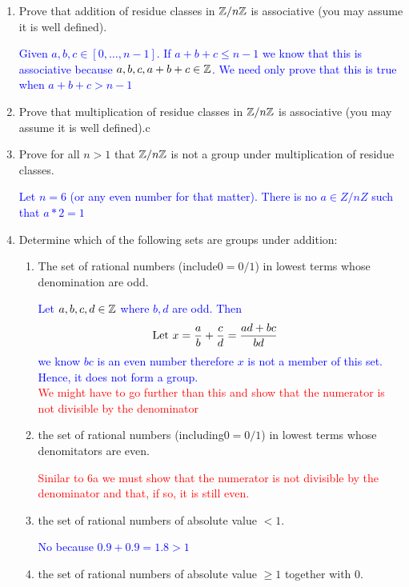 \documentclass[10pt,a4paper]{report}
\newcommand{\RED}[1]{\textcolor{red}{#1}}
\newcommand{\BLUE}[1]{\textcolor{blue}{#1}}
\begin{document}
\begin{enumerate}
\begin{enumerate}
	\end{enumerate}	
	
	\item Prove that addition of residue classes in $\mathbb{Z}/n\mathbb{Z}$ is associative (you may assume it is well defined).
	
	\BLUE{Given $a,b,c \in [0, \dots, n-1]$.  If $a+b+c \le n-1$ we know that this is associative because $a,b,c, a+b+c \in \mathbb{Z}$.  We need only prove that this is true when $a+b+c > n-1$
	}
	
	\item Prove that multiplication of residue classes in $\mathbb{Z}/n\mathbb{Z}$ is associative (you may assume it is well defined).c
	
	\item Prove for all $n >1$ that $\mathbb{Z}/n\mathbb{Z}$ is not a group under multiplication of residue classes.
	
	\BLUE{Let $n=6$ (or any even number for that matter).  There is no $a\in Z/nZ$ such that $a*2 = 1$
	}
	
	\item Determine which of the following sets are groups under addition:
	\begin{enumerate}
		\item The set of rational numbers (include$0=0/1$) in lowest terms whose denomination are odd.
		
		\BLUE{Let $a,b,c,d \in \mathbb{Z}$ where $b, d$ are odd. Then
		\begin{align*}
			\text{Let } x = \frac{a}{b} + \frac{c}{d} &= \frac{ad+bc}{bd}
		\end{align*} we know $bc$ is an even number therefore $x$ is not a member of this set.  Hence, it does not form a group.
		}\\ \RED{We might have to go further than this and show that the numerator is not divisible by the denominator}
		
		\item the set of rational numbers (including$0=0/1$) in lowest terms whose denomitators are even.
		
		\RED{Sinilar to 6a we must show that the numerator is not divisible by the denominator and that, if so, it is still even.
		}
		
		\item the set of rational numbers of absolute value $< 1$.
		
		\BLUE{ No because $0.9+0.9=1.8 > 1$ }
		
		\item the set of rational numbers of absolute value $\ge 1$ together with 0.
		

\end{enumerate}
\end{enumerate}
\end{document}
